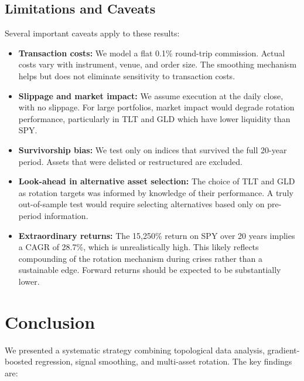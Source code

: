 \documentclass[11pt, a4paper]{article}
\begin{document}
\subsection{Limitations and Caveats}

Several important caveats apply to these results:

\begin{itemize}[nosep]
    \item \textbf{Transaction costs:} We model a flat 0.1\% round-trip commission. Actual costs vary with instrument, venue, and order size. The smoothing mechanism helps but does not eliminate sensitivity to transaction costs.
    \item \textbf{Slippage and market impact:} We assume execution at the daily close, with no slippage. For large portfolios, market impact would degrade rotation performance, particularly in TLT and GLD which have lower liquidity than SPY.
    \item \textbf{Survivorship bias:} We test only on indices that survived the full 20-year period. Assets that were delisted or restructured are excluded.
    \item \textbf{Look-ahead in alternative asset selection:} The choice of TLT and GLD as rotation targets was informed by knowledge of their performance. A truly out-of-sample test would require selecting alternatives based only on pre-period information.
    \item \textbf{Extraordinary returns:} The 15{,}250\% return on SPY over 20 years implies a CAGR of 28.7\%, which is unrealistically high. This likely reflects compounding of the rotation mechanism during crises rather than a sustainable edge. Forward returns should be expected to be substantially lower.
\end{itemize}

\section{Conclusion}

We presented a systematic strategy combining topological data analysis, gradient-boosted regression, signal smoothing, and multi-asset rotation. The key findings are:
\end{document}
